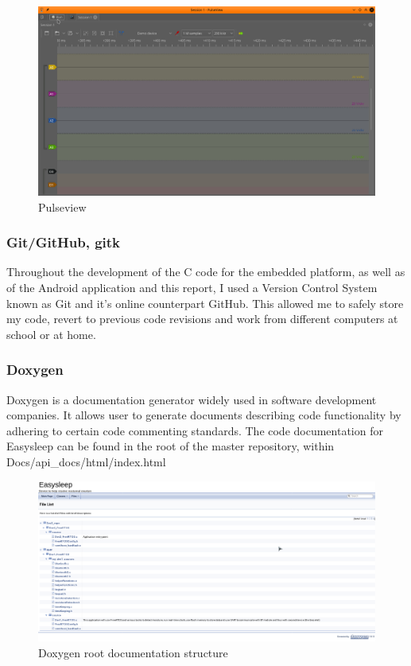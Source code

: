 \documentclass[12pt,a4paper]{article}
\begin{document}
            \begin{figure}[h]
                \centering
                \includegraphics[width=\textwidth]{pulseview}
                \caption{Pulseview}
                \label{fig:pulseView}
            \end{figure}
        
            \subsubsection{Git/GitHub, gitk}
            Throughout the development of the C code for the embedded platform, as well as of the 
            Android application and this report, I used a Version Control System known as Git and 
            it's online counterpart GitHub. This allowed me to safely store my code, revert to 
            previous code revisions and work from different computers at school or at home.
            
            \subsubsection{Doxygen}
            Doxygen is a documentation generator widely used in software development companies. It
            allows user to generate documents describing code functionality by adhering 
            to certain code commenting standards. The code documentation for Easysleep can be found in the root of the master repository, within Docs/api\_docs/html/index.html\\
            
            \begin{figure}[h]
                \centering
                \includegraphics[width=\textwidth]{doxygen_root.png}
                \caption{Doxygen root documentation structure}
                \label{fig:doxygenRoot}
            \end{figure}
            
\end{document}
